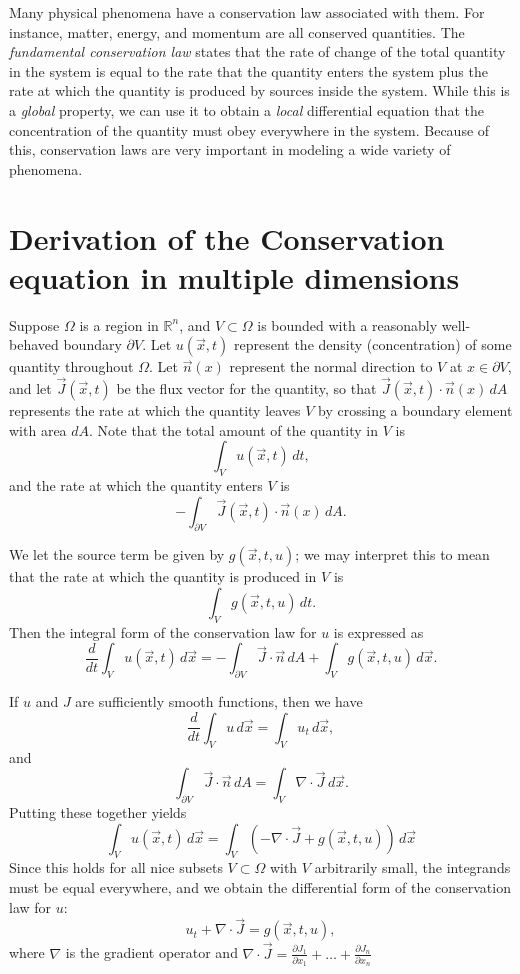 \label{lab:HeatFlow}

Many physical phenomena have a conservation law associated with them.
For instance, matter, energy, and momentum are all conserved quantities.
The \textit{fundamental conservation law} states that the rate of change of the total quantity in the system is equal to the rate that the quantity enters the system plus the rate at which the quantity is produced by sources inside the system.
While this is a \textit{global} property, we can use it to obtain a \textit{local} differential equation that the concentration of the quantity must obey everywhere in the system.
Because of this, conservation laws are very important in modeling a wide variety of phenomena.

\section*{Derivation of the Conservation equation in multiple dimensions}
Suppose $\Omega$ is a region in $\mathbb{R}^n$, and $V \subset \Omega$ is bounded with a reasonably well-behaved boundary $\partial V$.
Let $u(\vec{x},t)$ represent the density (concentration) of some quantity throughout $\Omega$.
Let $\vec{n}(x)$ represent the normal direction to $V$ at $x \in \partial V$, and let $\vec{J}(\vec{x},t)$ be the flux vector for the quantity, so that $\vec{J}(\vec{x},t) \cdot \vec{n}(x) \, dA$ represents the rate at which the quantity leaves $V$ by crossing a boundary element with area $dA$.
Note that the total amount of the quantity in $V$ is
\[ \int_V u(\vec{x},t)\, dt,\]
and the rate at which the quantity enters $V$ is
\[-\int_{\partial V} \vec{J}(\vec{x},t) \cdot \vec{n}(x) \, dA.\]

We let the source term be given by $g(\vec{x},t,u)$; we may interpret this to mean that the rate at which the quantity is produced in $V$ is
\[\int_V g(\vec{x},t,u)\, dt.\]
Then the integral form of the conservation law for $u$ is expressed as
\[\frac{d}{dt} \int_V u(\vec{x},t) \, d\vec{x} = -\int_{\partial V} \vec{J}\cdot \vec{n}\, dA + \int_V g(\vec{x},t,u)\, d\vec{x}.\]

If $u$ and $J$ are sufficiently smooth functions, then we have
\[ \frac{d}{dt} \int_V u\, d\vec{x} = \int_V u_t \, d\vec{x},\]
and
\[ \int_{\partial V} \vec{J}\cdot \vec{n}\, dA = \int_V \nabla \cdot \vec{J}\, d\vec{x} .\]
Putting these together yields
\[
\int_Vu(\vec x,t)\,d\vec x = \int_V\left(
-\nabla\cdot \vec{J} + g(\vec{x},t,u)
\right)\,d\vec x
\]
Since this holds for all nice subsets $V \subset \Omega$ with $V$ arbitrarily small, the integrands must be equal everywhere, and we obtain the differential form of the conservation law for $u$:
\[ u_t + \nabla \cdot \vec{J} = g(\vec{x},t,u) ,\]
where $\nabla$ is the gradient operator and $\nabla \cdot \vec{J} = \frac{\partial J_1}{\partial x_1} + \dots + \frac{\partial J_n}{\partial x_n}$

